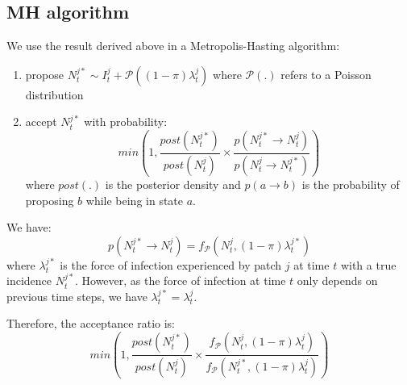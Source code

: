 \documentclass[a4paper,11pt]{article}
\begin{document}
\subsection{MH algorithm}

We use the result derived above in a Metropolis-Hasting algorithm:
\begin{enumerate}
 \item propose $N_t^{j*} \sim I_t^j + \mathcal{P}((1-\pi)\lambda_t^j)$ where 
$\mathcal{P}(.)$ refers to a Poisson distribution
 \item accept $N_t^{j*}$ with probability:
 $$
 min(1, \frac{post(N_t^{j*})}{post(N_t^j)} \times \frac{p(N_t^{j*} \rightarrow 
N_t^j)}{p(N_t^{j} \rightarrow N_t^{j*})})
 $$
where $post(.)$ is the posterior density and $p(a \rightarrow b)$ is the 
probability of proposing $b$ while being in state $a$.
\end{enumerate}
We have:
\begin{equation}
 p(N_t^{j*} \rightarrow N_t^j) = f_{\mathcal{P}}(N_t^j, (1-\pi)\lambda_t^{j*})
\end{equation}
where $\lambda_t^{j*}$ is the force of infection experienced by patch $j$ at 
time $t$ with a true incidence $N_t^{j*}$.
However, as the force of infection at time $t$ only depends on previous time 
steps, we have $\lambda_t^{j*} = \lambda_t^{j} $.

Therefore, the acceptance ratio is:
\begin{equation}
min(1, \frac{post(N_t^{j*})}{post(N_t^j)} \times
\frac{f_{\mathcal{P}}(N_t^j, 
(1-\pi)\lambda_t^j)}{f_{\mathcal{P}}(N_t^{j*}, 
(1-\pi)\lambda_t^j)} )
\end{equation}










%
%
\end{document}
